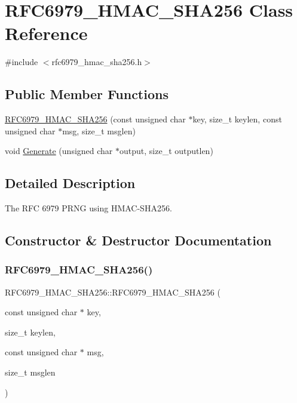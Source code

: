 \hypertarget{class_r_f_c6979___h_m_a_c___s_h_a256}{}\section{R\+F\+C6979\+\_\+\+H\+M\+A\+C\+\_\+\+S\+H\+A256 Class Reference}
\label{class_r_f_c6979___h_m_a_c___s_h_a256}


{\ttfamily \#include $<$rfc6979\+\_\+hmac\+\_\+sha256.\+h$>$}

\subsection*{Public Member Functions}
\begin{DoxyCompactItemize}
\item 
\mbox{\hyperlink{class_r_f_c6979___h_m_a_c___s_h_a256_aeab9ec7d2a564e2d98f2157ee7b83bef}{R\+F\+C6979\+\_\+\+H\+M\+A\+C\+\_\+\+S\+H\+A256}} (const unsigned char $\ast$key, size\+\_\+t keylen, const unsigned char $\ast$msg, size\+\_\+t msglen)
\item 
void \mbox{\hyperlink{class_r_f_c6979___h_m_a_c___s_h_a256_a9f841d552097f528631538e9939e0f70}{Generate}} (unsigned char $\ast$output, size\+\_\+t outputlen)
\end{DoxyCompactItemize}


\subsection{Detailed Description}
The R\+FC 6979 P\+R\+NG using H\+M\+A\+C-\/\+S\+H\+A256. 

\subsection{Constructor \& Destructor Documentation}
\mbox{\label{class_r_f_c6979___h_m_a_c___s_h_a256_aeab9ec7d2a564e2d98f2157ee7b83bef}} 
\subsubsection{\texorpdfstring{RFC6979\_HMAC\_SHA256()}{RFC6979\_HMAC\_SHA256()}}
{\footnotesize\ttfamily R\+F\+C6979\+\_\+\+H\+M\+A\+C\+\_\+\+S\+H\+A256\+::\+R\+F\+C6979\+\_\+\+H\+M\+A\+C\+\_\+\+S\+H\+A256 (\begin{DoxyParamCaption}\item[{const unsigned char $\ast$}]{key,  }\item[{size\+\_\+t}]{keylen,  }\item[{const unsigned char $\ast$}]{msg,  }\item[{size\+\_\+t}]{msglen }\end{DoxyParamCaption})}

